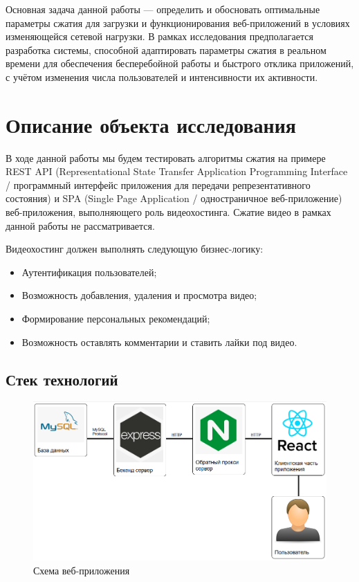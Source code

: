 \documentclass[12pt]{article}
\begin{document}
Основная задача данной работы — определить и обосновать оптимальные параметры сжатия для загрузки и функционирования
веб-приложений в условиях изменяющейся сетевой нагрузки. В рамках исследования предполагается разработка системы,
способной адаптировать параметры сжатия в реальном времени для обеспечения бесперебойной работы и быстрого отклика приложений,
с учётом изменения числа пользователей и интенсивности их активности.

\section{Описание объекта исследования}

В ходе данной работы мы будем тестировать алгоритмы сжатия на примере REST API
(Representational State Transfer Application Programming Interface / программный интерфейс приложения для передачи репрезентативного состояния)
и SPA (Single Page Application / одностраничное веб-приложение) веб-приложения, выполняющего роль видеохостинга.
Сжатие видео в рамках данной работы не рассматривается.

Видеохостинг должен выполнять следующую бизнес-логику:

\begin{itemize}
    \item Аутентификация пользователей;
    \item Возможность добавления, удаления и просмотра видео;
    \item Формирование персональных рекомендаций;
    \item Возможность оставлять комментарии и ставить лайки под видео.
\end{itemize}

\subsection{Стек технологий}

\begin{figure}[H]
    \centering
    \includegraphics[width=1\textwidth]{../images/Схема_веб-приложения.png}
    \caption{Схема веб-приложения}
\end{figure}
\end{document}

